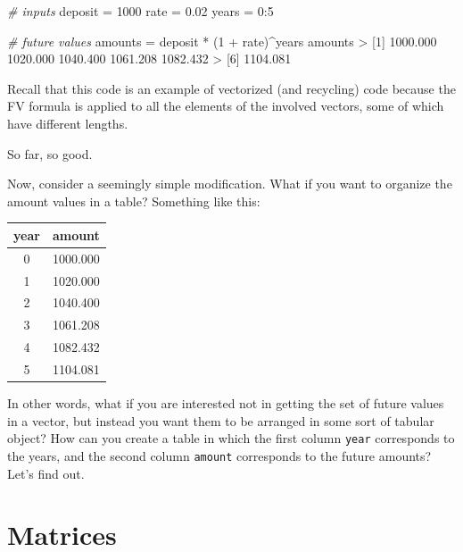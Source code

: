 \documentclass[
]{book}
\newenvironment{Shaded}{\begin{snugshade}}{\end{snugshade}}
\newcommand{\CommentTok}[1]{\textcolor[rgb]{0.56,0.35,0.01}{\textit{#1}}}
\newcommand{\DecValTok}[1]{\textcolor[rgb]{0.00,0.00,0.81}{#1}}
\newcommand{\FloatTok}[1]{\textcolor[rgb]{0.00,0.00,0.81}{#1}}
\newcommand{\NormalTok}[1]{#1}
\newcommand{\OtherTok}[1]{\textcolor[rgb]{0.56,0.35,0.01}{#1}}
\newcommand{\SpecialCharTok}[1]{\textcolor[rgb]{0.00,0.00,0.00}{#1}}
\begin{document}
\begin{Shaded}
\begin{Highlighting}[]
\CommentTok{\# inputs}
\NormalTok{deposit }\OtherTok{=} \DecValTok{1000}
\NormalTok{rate }\OtherTok{=} \FloatTok{0.02}
\NormalTok{years }\OtherTok{=} \DecValTok{0}\SpecialCharTok{:}\DecValTok{5}

\CommentTok{\# future values}
\NormalTok{amounts }\OtherTok{=}\NormalTok{ deposit }\SpecialCharTok{*}\NormalTok{ (}\DecValTok{1} \SpecialCharTok{+}\NormalTok{ rate)}\SpecialCharTok{\^{}}\NormalTok{years}
\NormalTok{amounts}
\SpecialCharTok{\textgreater{}}\NormalTok{ [}\DecValTok{1}\NormalTok{] }\FloatTok{1000.000} \FloatTok{1020.000} \FloatTok{1040.400} \FloatTok{1061.208} \FloatTok{1082.432}
\SpecialCharTok{\textgreater{}}\NormalTok{ [}\DecValTok{6}\NormalTok{] }\FloatTok{1104.081}
\end{Highlighting}
\end{Shaded}

Recall that this code is an example of vectorized (and recycling) code because
the FV formula is applied to all the elements of the involved vectors, some
of which have different lengths.

So far, so good.

Now, consider a seemingly simple modification. What if you want to organize
the amount values in a table? Something like this:

\begin{longtable}[]{@{}cc@{}}
\toprule()
year & amount \\
\midrule()
\endhead
0 & 1000.000 \\
1 & 1020.000 \\
2 & 1040.400 \\
3 & 1061.208 \\
4 & 1082.432 \\
5 & 1104.081 \\
\bottomrule()
\end{longtable}

In other words, what if you are interested not in getting the set of future
values in a vector, but instead you want them to be arranged in some sort of
tabular object? How can you create a table in which the first column \texttt{year}
corresponds to the years, and the second column \texttt{amount} corresponds to the
future amounts? Let's find out.

\hypertarget{matrices}{%
\section{Matrices}\label{matrices}}
\end{document}
